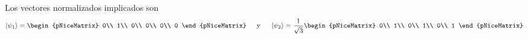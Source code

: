 \begin{enumerate}
    Los vectores normalizados implicados son
    {\small
      \[
        \ket{\psi_1}
        = \begin{pNiceMatrix}
          0\\
          1\\
          0\\
          0\\
          0\\
          0
        \end{pNiceMatrix}
        \hspace{1.5em}\text{y}\hspace{1.5em}
        \ket{\psi_2}
        = \frac{1}{\sqrt{3}}
        \begin{pNiceMatrix}
          0\\
          1\\
          0\\
          1\\
          0\\
          1
        \end{pNiceMatrix}      
      \]
    }
    

\end{enumerate}
